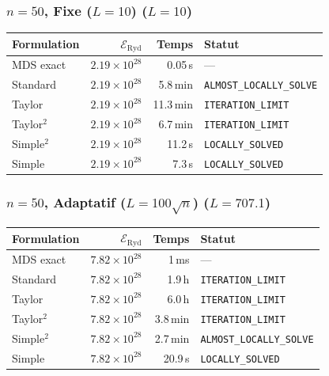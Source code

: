 \subsubsection{$n=50$, Fixe ($L{=}10$) ($L=10$)}
\begin{longtable}{@{}lrrl@{}}
  \toprule
  Formulation & $\mathcal{E}_{\mathrm{Ryd}}$ & Temps & Statut \\
  \midrule
  \endhead
  MDS exact & $2.19\times10^{28}$ & 0.05\,s & --- \\
  Standard & $2.19\times10^{28}$ & 5.8\,min & \texttt{ALMOST\_LOCALLY\_SOLVE} \\
  Taylor & $2.19\times10^{28}$ & 11.3\,min & \texttt{ITERATION\_LIMIT} \\
  Taylor$^2$ & $2.19\times10^{28}$ & 6.7\,min & \texttt{ITERATION\_LIMIT} \\
  Simple$^2$ & $2.19\times10^{28}$ & 11.2\,s & \texttt{LOCALLY\_SOLVED} \\
  Simple & $2.19\times10^{28}$ & 7.3\,s & \texttt{LOCALLY\_SOLVED} \\
  \bottomrule
\end{longtable}

\subsubsection{$n=50$, Adaptatif ($L{=}100\sqrt{n}$) ($L=707.1$)}
\begin{longtable}{@{}lrrl@{}}
  \toprule
  Formulation & $\mathcal{E}_{\mathrm{Ryd}}$ & Temps & Statut \\
  \midrule
  \endhead
  MDS exact & $7.82\times10^{28}$ & 1\,ms & --- \\
  Standard & $7.82\times10^{28}$ & 1.9\,h & \texttt{ITERATION\_LIMIT} \\
  Taylor & $7.82\times10^{28}$ & 6.0\,h & \texttt{ITERATION\_LIMIT} \\
  Taylor$^2$ & $7.82\times10^{28}$ & 3.8\,min & \texttt{ITERATION\_LIMIT} \\
  Simple$^2$ & $7.82\times10^{28}$ & 2.7\,min & \texttt{ALMOST\_LOCALLY\_SOLVE} \\
  Simple & $7.82\times10^{28}$ & 20.9\,s & \texttt{LOCALLY\_SOLVED} \\
  \bottomrule
\end{longtable}

